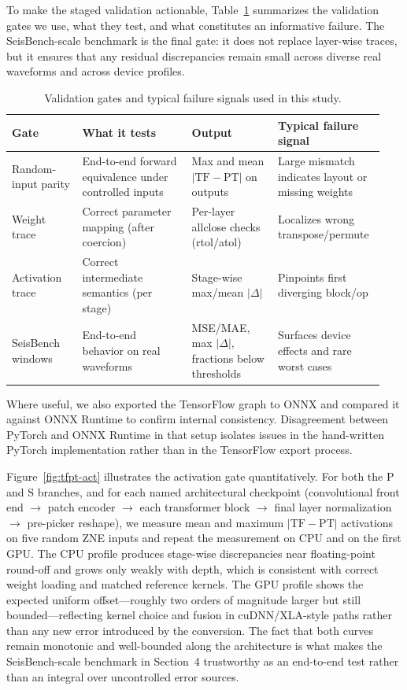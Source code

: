 To make the staged validation actionable, Table~\ref{tab:gates} summarizes the validation gates we use, what they test, and what constitutes an informative failure. The SeisBench-scale benchmark is the final gate: it does not replace layer-wise traces, but it ensures that any residual discrepancies remain small across diverse real waveforms and across device profiles.

\begin{table}[htbp]
  \centering
  \caption{Validation gates and typical failure signals used in this study.}
  \label{tab:gates}
  \small
  \begin{tabular}{@{}p{0.18\linewidth}p{0.28\linewidth}p{0.22\linewidth}p{0.26\linewidth}@{}}
    \toprule
    \textbf{Gate} & \textbf{What it tests} & \textbf{Output} & \textbf{Typical failure signal} \\
    \midrule
    Random-input parity & End-to-end forward equivalence under controlled inputs & Max and mean $|\mathrm{TF}-\mathrm{PT}|$ on outputs & Large mismatch indicates layout or missing weights \\
    Weight trace & Correct parameter mapping (after coercion) & Per-layer allclose checks (rtol/atol) & Localizes wrong transpose/permute \\
    Activation trace & Correct intermediate semantics (per stage) & Stage-wise max/mean $|\Delta|$ & Pinpoints first diverging block/op \\
    SeisBench windows & End-to-end behavior on real waveforms & MSE/MAE, max $|\Delta|$, fractions below thresholds & Surfaces device effects and rare worst cases \\
    \bottomrule
  \end{tabular}
\end{table}

Where useful, we also exported the TensorFlow graph to ONNX and compared it against ONNX Runtime to confirm internal consistency. Disagreement between PyTorch and ONNX Runtime in that setup isolates issues in the hand-written PyTorch implementation rather than in the TensorFlow export process.

Figure~\ref{fig:tfpt-act} illustrates the activation gate quantitatively. For both the P and S branches, and for each named architectural checkpoint (convolutional front end $\rightarrow$ patch encoder $\rightarrow$ each transformer block $\rightarrow$ final layer normalization $\rightarrow$ pre-picker reshape), we measure mean and maximum $|\mathrm{TF}-\mathrm{PT}|$ activations on five random ZNE inputs and repeat the measurement on CPU and on the first GPU. The CPU profile produces stage-wise discrepancies near floating-point round-off and grows only weakly with depth, which is consistent with correct weight loading and matched reference kernels. The GPU profile shows the expected uniform offset---roughly two orders of magnitude larger but still bounded---reflecting kernel choice and fusion in cuDNN/XLA-style paths rather than any new error introduced by the conversion. The fact that both curves remain monotonic and well-bounded along the architecture is what makes the SeisBench-scale benchmark in Section~4 trustworthy as an end-to-end test rather than an integral over uncontrolled error sources.

